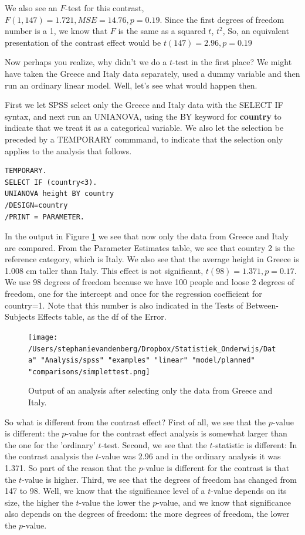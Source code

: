 \documentclass[]{book}\usepackage[]{graphicx}\usepackage[]{color}
\begin{document}
We also see an $F$-test for this contrast, $F(1, 147)=1.721, MSE= 14.76, p=0.19$.
Since the first degrees of freedom number is a 1, we know that $F$ is the same as a squared $t$, $t^2$, So, an equivalent presentation of the contrast effect would be $t(147)=2.96, p=0.19$

Now perhaps you realize, why didn't we do a $t$-test in the first place? We might have taken the Greece and Italy data separately, used a dummy variable and then run an ordinary linear model. Well, let's see what would happen then.

First we let SPSS select only the Greece and Italy data with the SELECT IF syntax, and next run an UNIANOVA, using the BY keyword for \textbf{country} to indicate that we treat it as a categorical variable. We also let the selection be preceded by a TEMPORARY commmand, to indicate that the selection only applies to the analysis that follows.

\begin{verbatim}
TEMPORARY.
SELECT IF (country<3).
UNIANOVA height BY country
/DESIGN=country
/PRINT = PARAMETER.  
\end{verbatim}


In the output in Figure \ref{fig:simplettest} we see that now only the data from Greece and Italy are compared. From the Parameter Estimates table, we see that country 2 is the reference category, which is Italy. We also see that the average height in Greece is 1.008 cm taller than Italy. This effect is not significant, $t(98)=1.371,p=0.17$. We use 98 degrees of freedom because we have 100 people and loose 2 degrees of freedom, one for the intercept and once for the regression coefficient for country=1. Note that this number is also indicated in the Tests of Between-Subjects Effects table, as the df of the Error.

\begin{figure}[h]
    \begin{center}
       \texttt{[image: /Users/stephanievandenberg/Dropbox/Statistiek\_Onderwijs/Data" "Analysis/spss" "examples" "linear" "model/planned" "comparisons/simplettest.png]}
    \end{center}
    \caption{Output of an analysis after selecting only the data from Greece and Italy.}
        \label{fig:simplettest}
\end{figure}

 

So what is different from the contrast effect? First of all, we see that the $p$-value is different: the $p$-value for the contrast effect analysis is somewhat larger than the one for the 'ordinary' $t$-test. Second, we see that the $t$-statistic is different: In the contrast analysis the $t$-value was 2.96 and in the ordinary analysis it was 1.371. So part of the reason that the $p$-value is different for the contrast is that the $t$-value is higher. Third, we see that the degrees of freedom has changed from 147 to 98. Well, we know that the significance level of a $t$-value depends on its size, the higher the $t$-value the lower the $p$-value, and we know that significance also depends on the degrees of freedom: the more degrees of freedom, the lower the $p$-value. 
\end{document}
